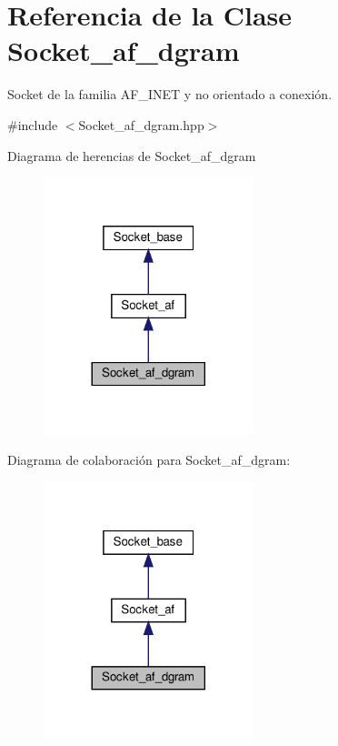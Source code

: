 \hypertarget{classSocket__af__dgram}{}\section{Referencia de la Clase Socket\+\_\+af\+\_\+dgram}
\label{classSocket__af__dgram}


Socket de la familia A\+F\+\_\+\+I\+N\+ET y no orientado a conexión.  




{\ttfamily \#include $<$Socket\+\_\+af\+\_\+dgram.\+hpp$>$}



Diagrama de herencias de Socket\+\_\+af\+\_\+dgram
\nopagebreak
\begin{figure}[H]
\begin{center}
\leavevmode
\includegraphics[width=173pt]{classSocket__af__dgram__inherit__graph}
\end{center}
\end{figure}


Diagrama de colaboración para Socket\+\_\+af\+\_\+dgram\+:
\nopagebreak
\begin{figure}[H]
\begin{center}
\leavevmode
\includegraphics[width=173pt]{classSocket__af__dgram__coll__graph}
\end{center}
\end{figure}
